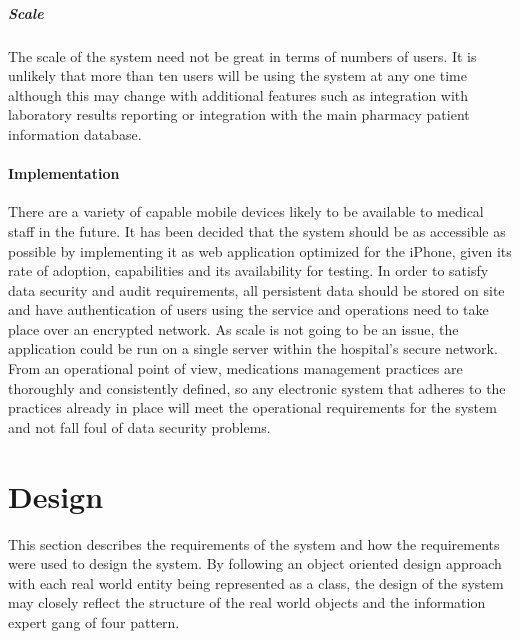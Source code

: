 \documentclass[letterpaper]{amsart}
\begin{document}
\subsubsection{Scale} The scale of the system need not be great in terms of numbers of users.  It is unlikely that more than ten users will be using the system at any one time although this may change with additional features such as integration with laboratory results reporting or integration with the main pharmacy patient information database.

\subsection{Implementation}
There are a variety of capable mobile devices likely to be available to medical staff in the future.  It has been decided that the system should be as accessible as possible by implementing it as web application optimized for the iPhone, given its rate of adoption, capabilities and its availability for testing.
In order to satisfy data security and audit requirements, all persistent data should be stored on site and have authentication of users using the service and operations need to take place over an encrypted network.
As scale is not going to be an issue, the application could be run on a single server within the hospital's secure network.
From an operational point of view, medications management practices are thoroughly and consistently defined, so any electronic system that adheres to the practices already in place will meet the operational requirements for the system and not fall foul of data security problems. 

\part{Design}
This section describes the requirements of the system and how the requirements were used to design the system. By following an object oriented design approach with each real world entity being represented as a class, the design of the system may closely reflect the structure of the real world objects and the information expert gang of four pattern.
\end{document}
